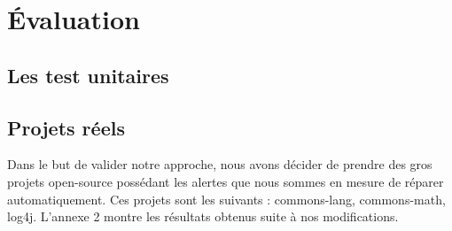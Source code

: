 \documentclass[a4paper]{article}
\begin{document}
\section{Évaluation}
\subsection{Les test unitaires}
\subsection{Projets réels}
\par Dans le but de valider notre approche, nous avons décider de prendre des gros projets open-source possédant les alertes que nous sommes en mesure de réparer automatiquement. Ces projets sont les suivants : commons-lang, commons-math, log4j. L'annexe 2 montre les résultats obtenus suite à nos modifications. 
\end{document}
